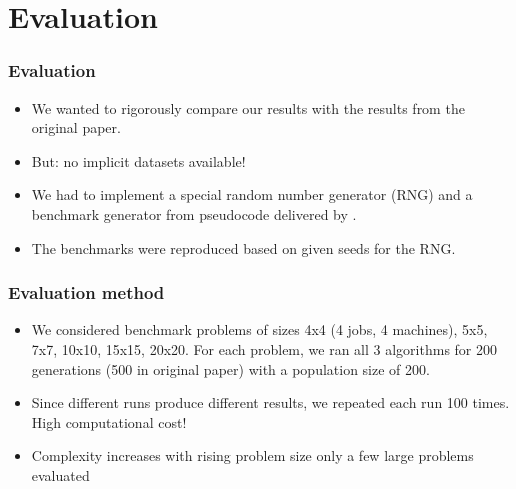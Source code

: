 \section{Evaluation}

\begin{frame}
  \frametitle{Evaluation}
\begin{itemize}

	\item We wanted to rigorously compare our results with the results from the original paper.
	\item But: no implicit datasets available!

	\item We had to implement a special random number generator (RNG) and a benchmark generator from pseudocode delivered by \cite{Benchmarks}.

	\item The benchmarks were reproduced based on given seeds for the RNG.
\end{itemize}

\end{frame}


\begin{frame}
	\frametitle{Evaluation method}
\begin{itemize}

	\item We considered benchmark problems of sizes 4x4 (4 jobs, 4 machines), 5x5, 7x7, 10x10, 15x15, 20x20. 
	For each problem, we  ran all 3 algorithms for 200 generations (500 in original paper) with a population size of 200.

	\item 	Since different runs produce different results, we repeated each run 100 times. 
	\\ 		\textrightarrow		High computational cost!

	\item 	Complexity increases with rising problem size \textrightarrow	only a few large problems evaluated 
\end{itemize}

	
\end{frame}


